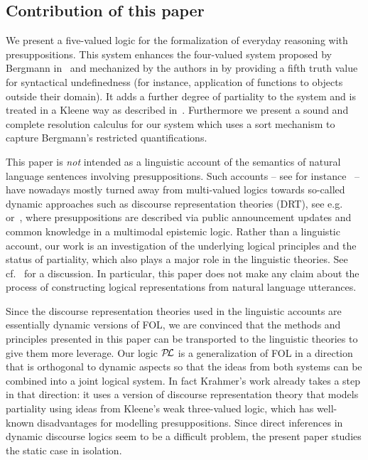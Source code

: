 \documentclass{\filespath jancl}
\def\presuppl{{\cal P\kern-.4ex L}}
\begin{document}
\subsection{Contribution of this paper}
\label{sec:contrib}

We present a five-valued logic for the formalization of everyday reasoning with
presuppositions. This system enhances the four-valued system proposed by Berg\-mann
in~\cite{Bergmann:patdl81} and mechanized by the authors in
\cite{KeKo:arcfp96} by providing a fifth truth value for syntactical
undefinedness
(for instance, application of functions to objects outside their domain). It adds a
further degree of partiality to the system and is treated in a Kleene way as described
in~\cite{KeKo94,KeKo:atcfpf96}. Furthermore we present a sound and complete
resolution calculus for our system which uses a sort mechanism to capture
Bergmann's restricted quantifications.

This paper is {\em not\/} intended as a linguistic account of the semantics of
natural language sentences involving presuppositions. Such accounts -- see for
instance~\cite{Sandt:ppaar92,Krahmer:dap95,Beaver:p97,BeaZee:a07} -- have
nowadays mostly turned away from multi-valued logics towards so-called dynamic
approaches such as discourse representation theories (DRT), see
e.g.~\cite{KamRey:fdtl93} or~\cite{EijckUnger07}, where
presuppositions are described via
public announcement updates and common knowledge in a multimodal
epistemic logic. Rather than a linguistic account, our work is an
investigation of the underlying logical principles and the status of
partiality, which also plays a major role in the linguistic theories.
See cf.~\cite{Krahmer:dap95} for a discussion. In particular, this paper does
not make any claim about the process of constructing logical representations
from natural language utterances.

Since the discourse representation theories used in the linguistic accounts are
essentially dynamic versions of FOL, we are convinced that the methods and principles
presented in this paper can be transported to the linguistic theories to give them more
leverage.  Our logic $\presuppl$ is a generalization of FOL in a direction that is
orthogonal to dynamic aspects so that the ideas from both systems can be combined into a
joint logical system. In fact Krahmer's work already takes a step in that direction: it
uses a version of discourse representation theory that models partiality using ideas from
Kleene's weak three-valued logic, which has well-known disadvantages for modelling
presuppositions. Since direct inferences in dynamic discourse logics seem to be a
difficult problem, the present paper studies the static case in isolation.
\end{document}

